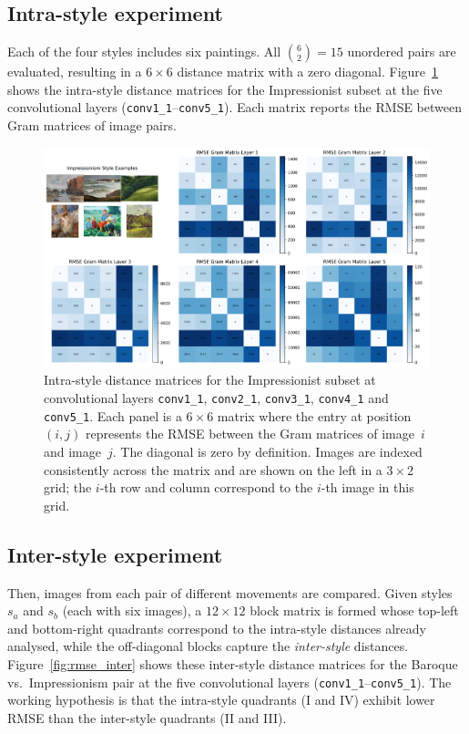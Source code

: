 \documentclass[a4paper,11pt]{article}
\begin{document}
\subsection{Intra-style experiment}
Each of the four styles includes six paintings. All $\binom{6}{2}=15$ unordered pairs are evaluated, resulting in a $6\times6$ distance matrix with a zero diagonal. Figure~\ref{fig:rmse_intra} shows the intra-style distance matrices for the Impressionist subset at the five convolutional layers (\texttt{conv1\_1}–\texttt{conv5\_1}). Each matrix reports the RMSE between Gram matrices of image pairs.

\begin{figure}[ht]
  \centering
  \includegraphics[width=\textwidth]{../figures/Impressionism_RMSE.png}
  \caption{Intra-style distance matrices for the Impressionist subset at convolutional layers \texttt{conv1\_1}, \texttt{conv2\_1}, \texttt{conv3\_1}, \texttt{conv4\_1} and \texttt{conv5\_1}. Each panel is a $6\times6$ matrix where the entry at position $(i,j)$ represents the RMSE between the Gram matrices of image~$i$ and image~$j$. The diagonal is zero by definition. Images are indexed consistently across the matrix and are shown on the left in a $3\times2$ grid; the $i$-th row and column correspond to the $i$-th image in this grid.}
  \label{fig:rmse_intra}
\end{figure}

\subsection{Inter-style experiment}
Then, images from each pair of different movements are compared. Given styles \(s_{a}\) and \(s_{b}\) (each with six images), a \(12\times12\) block matrix is formed whose top-left and bottom-right quadrants correspond to the intra-style distances already analysed, while the off-diagonal blocks capture the \emph{inter-style} distances. Figure~\ref{fig:rmse_inter} shows these inter-style distance matrices for the Baroque vs.\ Impressionism pair at the five convolutional layers (\texttt{conv1\_1}–\texttt{conv5\_1}). The working hypothesis is that the intra-style quadrants (I and IV) exhibit lower RMSE than the inter-style quadrants (II and III).
\end{document}
